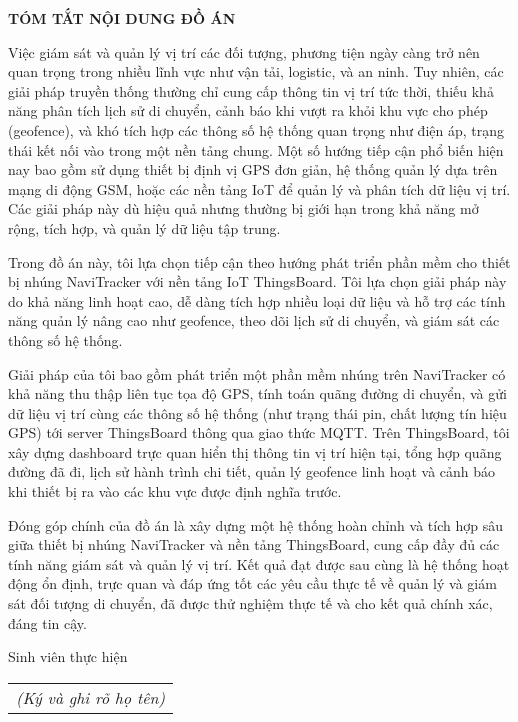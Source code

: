 \documentclass[../DoAn.tex]{subfiles}
\begin{document}
\begin{center}
    \Large{\textbf{TÓM TẮT NỘI DUNG ĐỒ ÁN}}\\
\end{center}
\vspace{1cm}
Việc giám sát và quản lý vị trí các đối tượng, phương tiện ngày càng trở nên quan trọng trong nhiều lĩnh vực như vận tải, logistic, và an ninh. Tuy nhiên, các giải pháp truyền thống thường chỉ cung cấp thông tin vị trí tức thời, thiếu khả năng phân tích lịch sử di chuyển, cảnh báo khi vượt ra khỏi khu vực cho phép (geofence), và khó tích hợp các thông số hệ thống quan trọng như điện áp, trạng thái kết nối vào trong một nền tảng chung. Một số hướng tiếp cận phổ biến hiện nay bao gồm sử dụng thiết bị định vị GPS đơn giản, hệ thống quản lý dựa trên mạng di động GSM, hoặc các nền tảng IoT để quản lý và phân tích dữ liệu vị trí. Các giải pháp này dù hiệu quả nhưng thường bị giới hạn trong khả năng mở rộng, tích hợp, và quản lý dữ liệu tập trung.

Trong đồ án này, tôi lựa chọn tiếp cận theo hướng phát triển phần mềm cho thiết bị nhúng NaviTracker với nền tảng IoT ThingsBoard. Tôi lựa chọn giải pháp này do khả năng linh hoạt cao, dễ dàng tích hợp nhiều loại dữ liệu và hỗ trợ các tính năng quản lý nâng cao như geofence, theo dõi lịch sử di chuyển, và giám sát các thông số hệ thống.

Giải pháp của tôi bao gồm phát triển một phần mềm nhúng trên NaviTracker có khả năng thu thập liên tục tọa độ GPS, tính toán quãng đường di chuyển, và gửi dữ liệu vị trí cùng các thông số hệ thống (như trạng thái pin, chất lượng tín hiệu GPS) tới server ThingsBoard thông qua giao thức MQTT. Trên ThingsBoard, tôi xây dựng dashboard trực quan hiển thị thông tin vị trí hiện tại, tổng hợp quãng đường đã đi, lịch sử hành trình chi tiết, quản lý geofence linh hoạt và cảnh báo khi thiết bị ra vào các khu vực được định nghĩa trước.

Đóng góp chính của đồ án là xây dựng một hệ thống hoàn chỉnh và tích hợp sâu giữa thiết bị nhúng NaviTracker và nền tảng ThingsBoard, cung cấp đầy đủ các tính năng giám sát và quản lý vị trí. Kết quả đạt được sau cùng là hệ thống hoạt động ổn định, trực quan và đáp ứng tốt các yêu cầu thực tế về quản lý và giám sát đối tượng di chuyển, đã được thử nghiệm thực tế và cho kết quả chính xác, đáng tin cậy.
\begin{flushright}
Sinh viên thực hiện\\
\begin{tabular}{@{}c@{}}
\textit{(Ký và ghi rõ họ tên)}
\end{tabular}
\end{flushright}
\end{document}
